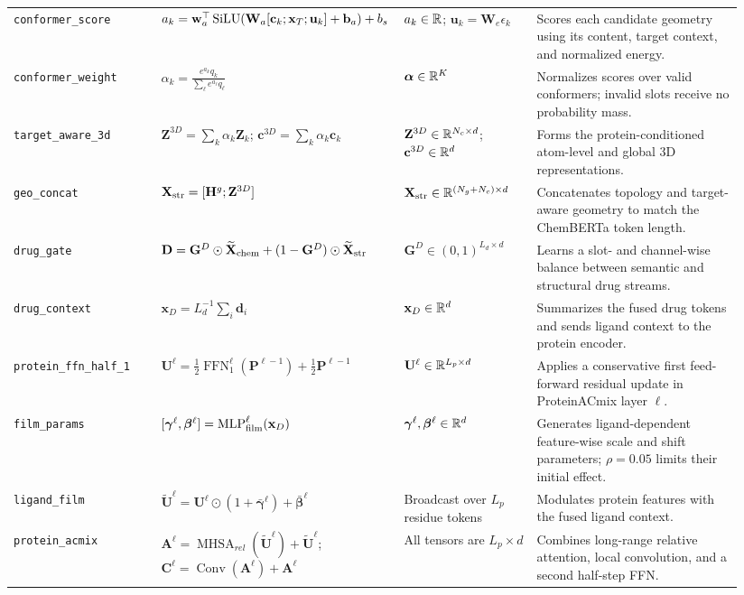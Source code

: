 \begin{longtable}{>{\RaggedRight\arraybackslash}p{0.20\linewidth}>{\RaggedRight\arraybackslash}p{0.28\linewidth}>{\RaggedRight\arraybackslash}p{0.18\linewidth}>{\RaggedRight\arraybackslash}p{0.28\linewidth}}
\texttt{conformer\_score} & $a_k=\mathbf w_a^\top\operatorname{SiLU}(\mathbf W_a[\mathbf c_k;\mathbf x_T;\mathbf u_k]+\mathbf b_a)+b_s$ & $a_k\in\mathbb{R}$; $\mathbf u_k=\mathbf W_e\epsilon_k$ & Scores each candidate geometry using its content, target context, and normalized energy. \\
\texttt{conformer\_weight} & $\alpha_k=\frac{e^{a_k}q_k}{\sum_\ell e^{a_\ell}q_\ell}$ & $\boldsymbol\alpha\in\mathbb{R}^K$ & Normalizes scores over valid conformers; invalid slots receive no probability mass. \\
\texttt{target\_aware\_3d} & $\mathbf Z^{3D}=\sum_k\alpha_k\mathbf Z_k$; $\mathbf c^{3D}=\sum_k\alpha_k\mathbf c_k$ & $\mathbf Z^{3D}\in\mathbb{R}^{N_c\times d}$; $\mathbf c^{3D}\in\mathbb{R}^d$ & Forms the protein-conditioned atom-level and global 3D representations. \\
\texttt{geo\_concat} & $\mathbf X_{\rm str}=[\mathbf H^g;\mathbf Z^{3D}]$ & $\mathbf X_{\rm str}\in\mathbb{R}^{(N_g+N_c)\times d}$ & Concatenates topology and target-aware geometry to match the ChemBERTa token length. \\
\texttt{drug\_gate} & $\mathbf D=\mathbf G^D\odot\widetilde{\mathbf X}_{\rm chem}+(1-\mathbf G^D)\odot\widetilde{\mathbf X}_{\rm str}$ & $\mathbf G^D\in(0,1)^{L_d\times d}$ & Learns a slot- and channel-wise balance between semantic and structural drug streams. \\
\texttt{drug\_context} & $\mathbf x_D=L_d^{-1}\sum_i\mathbf d_i$ & $\mathbf x_D\in\mathbb{R}^d$ & Summarizes the fused drug tokens and sends ligand context to the protein encoder. \\
\texttt{protein\_ffn\_half\_1} & $\mathbf U^\ell=\tfrac12\operatorname{FFN}_1^\ell(\mathbf P^{\ell-1})+\tfrac12\mathbf P^{\ell-1}$ & $\mathbf U^\ell\in\mathbb{R}^{L_p\times d}$ & Applies a conservative first feed-forward residual update in ProteinACmix layer $\ell$. \\
\texttt{film\_params} & $[\boldsymbol\gamma^\ell,\boldsymbol\beta^\ell]=\operatorname{MLP}_{\rm film}^\ell(\mathbf x_D)$ & $\boldsymbol\gamma^\ell,\boldsymbol\beta^\ell\in\mathbb{R}^d$ & Generates ligand-dependent feature-wise scale and shift parameters; $\rho=0.05$ limits their initial effect. \\
\texttt{ligand\_film} & $\widetilde{\mathbf U}^\ell=\mathbf U^\ell\odot(1+\bar{\boldsymbol\gamma}^\ell)+\bar{\boldsymbol\beta}^\ell$ & Broadcast over $L_p$ residue tokens & Modulates protein features with the fused ligand context. \\
\texttt{protein\_acmix} & $\mathbf A^\ell=\operatorname{MHSA}_{rel}(\widetilde{\mathbf U}^\ell)+\widetilde{\mathbf U}^\ell$; $\mathbf C^\ell=\operatorname{Conv}(\mathbf A^\ell)+\mathbf A^\ell$ & All tensors are $L_p\times d$ & Combines long-range relative attention, local convolution, and a second half-step FFN. \\

\end{longtable}
